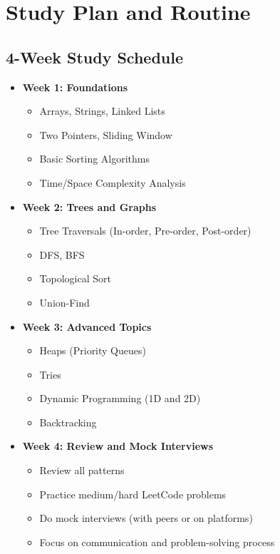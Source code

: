 \documentclass[11pt, a4paper]{article}
\begin{document}
\section{Study Plan and Routine}
\subsection{4-Week Study Schedule}
\begin{itemize}
    \item \textbf{Week 1: Foundations}
    \begin{itemize}
        \item Arrays, Strings, Linked Lists
        \item Two Pointers, Sliding Window
        \item Basic Sorting Algorithms
        \item Time/Space Complexity Analysis
    \end{itemize}
    \item \textbf{Week 2: Trees and Graphs}
    \begin{itemize}
        \item Tree Traversals (In-order, Pre-order, Post-order)
        \item DFS, BFS
        \item Topological Sort
        \item Union-Find
    \end{itemize}
    \item \textbf{Week 3: Advanced Topics}
    \begin{itemize}
        \item Heaps (Priority Queues)
        \item Tries
        \item Dynamic Programming (1D and 2D)
        \item Backtracking
    \end{itemize}
    \item \textbf{Week 4: Review and Mock Interviews}
    \begin{itemize}
        \item Review all patterns
        \item Practice medium/hard LeetCode problems
        \item Do mock interviews (with peers or on platforms)
        \item Focus on communication and problem-solving process
    \end{itemize}
\end{itemize}
\end{document}
